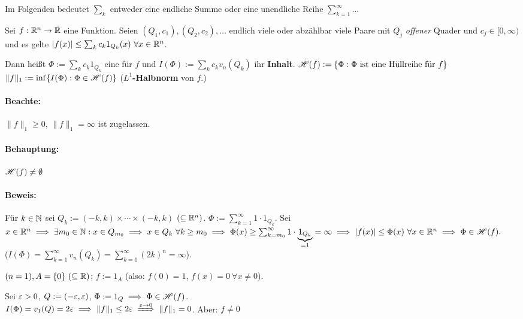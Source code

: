 \documentclass[a4paper,twoside,DIV15,BCOR12mm]{scrbook}
\begin{document}
Im Folgenden bedeutet $\sum_{k}$ entweder eine endliche Summe oder eine unendliche Reihe $\sum_{k=1}^\infty\ldots$

\begin{definition}
Sei $f:\mathbb{R}^n\to \tilde{\mathbb{R}}$ eine Funktion. Seien $(Q_1,c_1), (Q_2,c_2), \ldots$ endlich viele oder abzählbar viele Paare mit $Q_j$ \emph{offener} Quader und $c_j\in[0,\infty)$ und es gelte $|f(x)| \le \sum_{k} c_k 1_{Q_k}(x) \ \forall x\in\mathbb{R}^n$.

Dann heißt $\Phi:= \sum_{k} c_k 1_{Q_k}$ eine  für $f$ und $I(\Phi) := \sum_{k} c_k v_n(Q_k)$ ihr \textbf{Inhalt}.
$\mathscr{H}(f) := \{\Phi: \Phi \text{ ist eine Hüllreihe für }f\}$
$\|f\|_1 := \inf\{I(\Phi): \Phi \in \mathscr{H}(f)\}$ (\textbf{$L^1$-Halbnorm} von $f$.)
\end{definition}

\paragraph{Beachte:}
$\|f\|_1 \ge 0$, $\|f\|_1 = \infty$ ist zugelassen.


\paragraph{Behauptung:} $\mathscr{H}(f) \ne \emptyset$
\paragraph{Beweis:} Für $k\in\mathbb{N}$ sei $Q_k := (-k, k)\times\cdots\times(-k,k)$ $(\subseteq \mathbb{R}^n)$. $\Phi := \sum_{k=1}^\infty 1\cdot1_{Q_k}$. Sei $x\in\mathbb{R}^n \implies \exists m_0 \in \mathbb{N}: x\in Q_{m_0} \implies x\in Q_k \ \forall k\ge m_0 \implies \Phi(x) \ge \sum_{k=m_0}^\infty 1\cdot \underbrace{1_{Q_k}}_{=1} = \infty \implies |f(x)| \le \Phi(x) \ \forall x\in\mathbb{R}^n \implies \Phi \in \mathscr{H}(f).$\\($I(\Phi) = \sum_{k=1}^\infty v_n(Q_k) = \sum_{k=1}^\infty (2k)^n = \infty$).

\begin{beispiel}
$(n=1), A=\{0\} \ (\subseteq \mathbb{R})$; $f:= 1_A$ (also: $f(0)=1$, $f(x)= 0 \ \forall x\ne0$).

Sei $\varepsilon>0$, $Q:=(-\varepsilon,\varepsilon)$, $\Phi := 1_Q \implies \Phi \in \mathscr{H}(f)$.\\
$I(\Phi)=v_1(Q) = 2\ep \folgt \|f\|_1 \le 2\ep \folgtwegen{\ep\to0} \|f\|_1 = 0$. Aber: $f\ne0$
\end{beispiel}
\end{document}
